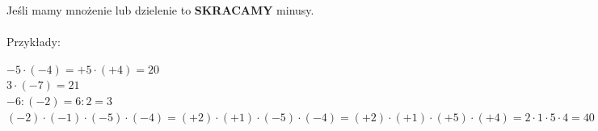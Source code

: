 \documentclass[12pt,a4paper]{article}
\begin{document}
	\begin{mdframed}[style=wzor]
		\large Jeśli mamy mnożenie lub dzielenie to \textbf{SKRACAMY} minusy.
		\\\\\normalsize
		Przykłady:
		
		$-5\cdot (-4) = +5 \cdot (+4) = 20$\\
		
		$3 \cdot (-7) = 21$\\
		
		$-6 : (-2) = 6 : 2 = 3$\\
		
		$(-2) \cdot (-1) \cdot (-5) \cdot (-4) = (+2) \cdot (+1) \cdot (-5) \cdot (-4)= (+2) \cdot (+1) \cdot (+5) \cdot (+4) = 2\cdot1\cdot5\cdot4 = 40$
	\end{mdframed}
\end{document}
